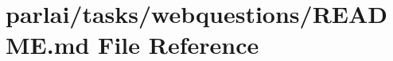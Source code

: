 \hypertarget{parlai_2tasks_2webquestions_2README_8md}{}\section{parlai/tasks/webquestions/\+R\+E\+A\+D\+ME.md File Reference}
\label{parlai_2tasks_2webquestions_2README_8md}

